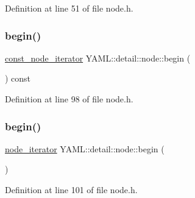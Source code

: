 Definition at line 51 of file node.\+h.

\mbox{\label{class_y_a_m_l_1_1detail_1_1node_afc3743c3c34c9784927c7b085d8750b0}} 
\subsubsection{\texorpdfstring{begin()}{begin()}\hspace{0.1cm}{\footnotesize\ttfamily [1/2]}}
{\footnotesize\ttfamily \mbox{\hyperlink{namespace_y_a_m_l_1_1detail_a049af8e269401cbe1e735033914e4356}{const\+\_\+node\+\_\+iterator}} Y\+A\+M\+L\+::detail\+::node\+::begin (\begin{DoxyParamCaption}{ }\end{DoxyParamCaption}) const\hspace{0.3cm}{\ttfamily [inline]}}



Definition at line 98 of file node.\+h.

\mbox{\label{class_y_a_m_l_1_1detail_1_1node_a032839fe4b765cb67eee75de36ac9090}} 
\subsubsection{\texorpdfstring{begin()}{begin()}\hspace{0.1cm}{\footnotesize\ttfamily [2/2]}}
{\footnotesize\ttfamily \mbox{\hyperlink{namespace_y_a_m_l_1_1detail_aa2a961156810d41a3b6744c10186afac}{node\+\_\+iterator}} Y\+A\+M\+L\+::detail\+::node\+::begin (\begin{DoxyParamCaption}{ }\end{DoxyParamCaption})\hspace{0.3cm}{\ttfamily [inline]}}



Definition at line 101 of file node.\+h.

\mbox{\label{class_y_a_m_l_1_1detail_1_1node_a36f3bc6ea07dbdb9d178ea32fbc4aa60}} 
